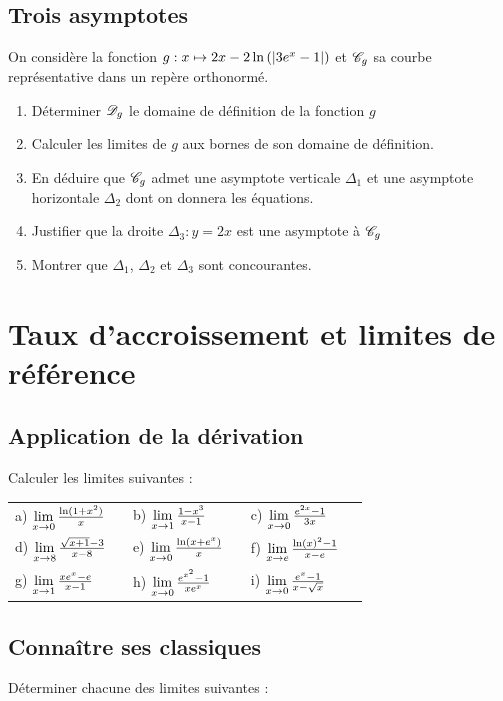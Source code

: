 \documentclass[oneside,12pt]{book}          %
\begin{document}
\subsection{Trois asymptotes}
On considère la fonction $g:x\mapsto 2x-2\ln\left({\left\lvert 3e^x-1 \right\rvert}\right)$ et ${\mathscr{C}}_g$ sa courbe représentative dans un repère orthonormé.
\begin{enumerate}
	\item Déterminer ${\mathscr{D}}_g$ le domaine de définition de la fonction $g$
	\item Calculer les limites de $g$ aux bornes de son domaine de définition.
	\item En déduire que ${\mathscr{C}}_g$ admet une asymptote verticale $\Delta_1$ et une asymptote horizontale $\Delta_2$ dont on donnera les équations.
	\item Justifier que la droite $\Delta_3:y=2x$ est une asymptote à ${\mathscr{C}}_g$
	\item Montrer que $\Delta_1$, $\Delta_2$ et $\Delta_3$ sont concourantes.
\end{enumerate}


 
\section{Taux d'accroissement et limites de référence}


\subsection{Application de la dérivation}
Calculer les limites suivantes :

\begin{tabular}{p{0.3\linewidth} p{0.3\linewidth} p{0.3\linewidth}}
    a) ${\lim\limits_{\substack{x\to0}}}\,\frac{\ln(1+x^2)}{x}$ & b) ${\lim\limits_{\substack{x\to1}}}\,\frac{1-x^3}{x-1}$ & c) ${\lim\limits_{\substack{x\to0}}}\,\frac{e^{2x}-1}{3x}$ \\ 
    d) ${\lim\limits_{\substack{x\to8}}}\,\frac{\sqrt{x+1}-3}{x-8}$ & e) ${\lim\limits_{\substack{x\to0}}}\,\frac{\ln(x+e^x)}{x}$ & f) ${\lim\limits_{\substack{x\to e}}}\,\frac{\ln(x)^2-1}{x-e}$ \\
    g) ${\lim\limits_{\substack{x\to1}}}\,\frac{xe^x-e}{x-1}$ & h) ${\lim\limits_{\substack{x\to0}}}\,\frac{e^{x^2}-1}{xe^x}$ & i) ${\lim\limits_{\substack{x\to0}}}\,\frac{e^x-1}{x-\sqrt{x}}$ \\
\end{tabular}



\subsection{Connaître ses classiques}
Déterminer chacune des limites suivantes :
\end{document}
